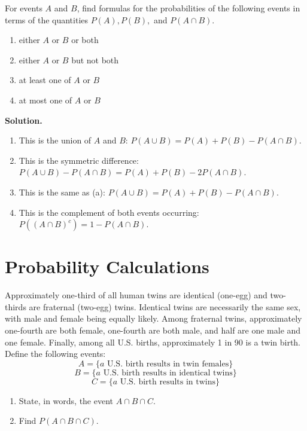 \begin{problembox}
For events $A$ and $B$, find formulas for the probabilities of the following events in terms of the quantities $P(A), P(B),$ and $P(A \cap B)$.
\begin{enumerate}[label=(\alph*)]
    \item either $A$ or $B$ or both
    \item either $A$ or $B$ but not both
    \item at least one of $A$ or $B$
    \item at most one of $A$ or $B$
\end{enumerate}
\end{problembox}

\noindent\textbf{Solution.}
\begin{enumerate}[label=(\alph*)]
    \item This is the union of $A$ and $B$: $P(A \cup B) = P(A) + P(B) - P(A \cap B)$.
    
    \item This is the symmetric difference: $P(A \cup B) - P(A \cap B) = P(A) + P(B) - 2P(A \cap B)$.
    
    \item This is the same as (a): $P(A \cup B) = P(A) + P(B) - P(A \cap B)$.
    
    \item This is the complement of both events occurring: $P((A \cap B)^c) = 1 - P(A \cap B)$.
\end{enumerate}


\section{Probability Calculations}

\begin{problembox}
Approximately one-third of all human twins are identical (one-egg) and two-thirds are fraternal (two-egg) twins. Identical twins are necessarily the same sex, with male and female being equally likely. Among fraternal twins, approximately one-fourth are both female, one-fourth are both male, and half are one male and one female. Finally, among all U.S. births, approximately 1 in 90 is a twin birth. Define the following events:
\[ A = \{a \text{ U.S. birth results in twin females}\} \]
\[ B = \{a \text{ U.S. birth results in identical twins}\} \]
\[ C = \{a \text{ U.S. birth results in twins}\} \]
\begin{enumerate}[label=(\alph*)]
    \item State, in words, the event $A \cap B \cap C$.
    \item Find $P(A \cap B \cap C)$.
\end{enumerate}
\end{problembox}

